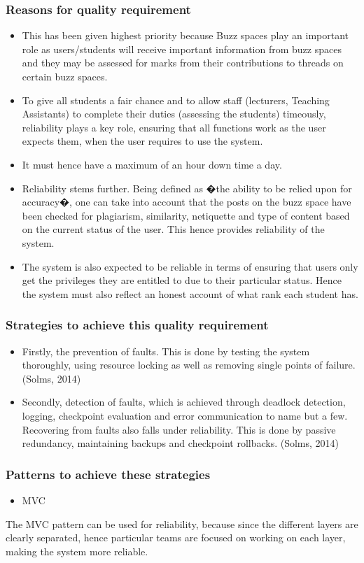 \documentclass[a4paper,12pt]{report}
\begin{document}
	\subsubsection{Reasons for quality requirement}
	\begin{itemize}
	\item This has been given highest priority because Buzz spaces play an important role as users/students will receive important information from buzz spaces and they may be assessed for marks from their contributions to threads on certain buzz spaces. 
	\item To give all students a fair chance and to allow staff (lecturers, Teaching Assistants) to complete their duties (assessing the students) timeously, reliability plays a key role, ensuring that all functions work as the user expects them, when the user requires to use the system.
	\item It must hence have a maximum of an hour down time a day.
	\item Reliability stems further. Being defined as �the ability to be relied upon for accuracy�, one can take into account that the posts on the buzz space have been checked for plagiarism, similarity, netiquette and type of content based on the current status of the user. This hence provides reliability of the system. 
	\item The system is also expected to be reliable in terms of ensuring that users only get the privileges they are entitled to due to their particular status. Hence the system must also reflect an honest account of what rank each student has. 
	\end{itemize}
	\subsubsection{Strategies to achieve this quality requirement}
	\begin{itemize}
	\item Firstly, the prevention of faults. This is done by testing the system thoroughly, using resource locking as well as removing single points of failure. (Solms, 2014)
 \item Secondly, detection of faults, which is achieved through deadlock detection, logging, checkpoint evaluation and error communication to name but a few. Recovering from faults also falls under reliability. This is done by passive redundancy, maintaining backups and checkpoint rollbacks. (Solms, 2014)
 \end{itemize}
 \subsubsection{Patterns to achieve these strategies}
 \begin{itemize}
 \item MVC
 \end{itemize}
 The MVC pattern can  be used for reliability, because since the different layers are clearly separated, hence particular teams are focused on working on each layer, making the system more reliable. 
\end{document}
